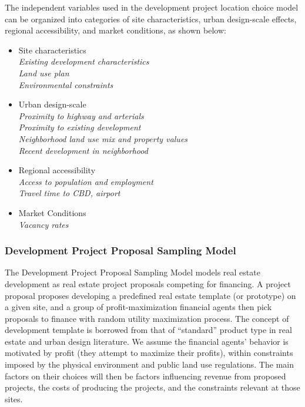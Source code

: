 The independent variables used in the development project
location choice model can be organized into categories of
site characteristics, urban design-scale effects, regional
accessibility, and market conditions, as shown below:

\begin{itemize}
\item Site characteristics \\
\emph{Existing development characteristics \\
Land use plan \\
Environmental constraints}

\item Urban design-scale \\
\emph{Proximity to highway and arterials \\
Proximity to existing development \\
Neighborhood land use mix and property values \\
Recent development in neighborhood}

\item Regional accessibility \\
\emph{Access to population and employment \\
Travel time to CBD, airport}

\item Market Conditions \\
\emph{Vacancy rates}
\end{itemize}

\subsubsection{Development Project Proposal Sampling Model}
The Development Project Proposal Sampling Model models real
estate development as real estate project proposals
competing for financing.  A project proposal proposes
developing a predefined real estate template (or prototype)
on a given site, and a group of profit-maximization
financial agents then pick proposals to finance with random
utility maximization process.  The concept of development
template is borrowed from that of ``standard'' product type
in real estate \cite{Hooper1999} and urban design
literature\cite{Song2007}.  We assume the financial agents'
behavior is motivated by profit (they attempt to maximize
their profits), within constraints imposed by the physical
environment and public land use regulations.  The main
factors on their choices will then be factors influencing
revenue from proposed projects, the costs of
producing the projects, and the constraints
relevant at those sites.

